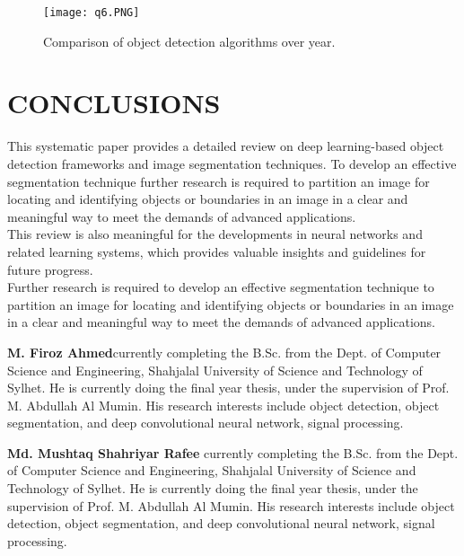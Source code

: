 \documentclass[two column]{ieeeaccess}
\begin{document}
\begin{figure}[h]
    \centering
    \texttt{[image: q6.PNG]}
    \caption{Comparison of object detection algorithms over year.}
    \label{fig18}
\end{figure}




\section{CONCLUSIONS}
This systematic paper provides a detailed review on deep learning-based object detection frameworks and image segmentation techniques. To develop an effective segmentation technique further research is required to partition an image for locating and identifying objects or boundaries in an image in a clear and meaningful way to meet the demands of advanced applications. \\
This review is also meaningful for the developments in neural networks and related learning systems, which provides valuable insights and guidelines for future progress.   \\
Further research is required to develop an effective segmentation technique to partition an image for locating and identifying objects or boundaries in an image in a clear and meaningful way to meet the demands of advanced applications. \\







\begin{IEEEbiography}{\textbf{M. Firoz Ahmed}}currently completing the B.Sc. from the Dept. of Computer Science and Engineering, Shahjalal University of Science and Technology of Sylhet. He is currently doing the final year thesis, under the supervision of Prof. M. Abdullah Al Mumin. His research interests include object detection, object segmentation, and deep convolutional neural network, signal processing.
\end{IEEEbiography}

\vspace{-3in}

\begin{IEEEbiography}{\textbf{Md. Mushtaq Shahriyar Rafee}}
currently completing the B.Sc. from the Dept. of Computer Science and Engineering, Shahjalal University of Science and Technology of Sylhet. He is currently doing the final year thesis, under the supervision of Prof. M. Abdullah Al Mumin. His research interests include object detection, object segmentation, and deep convolutional neural network, signal processing.
\end{IEEEbiography}
\end{document}
